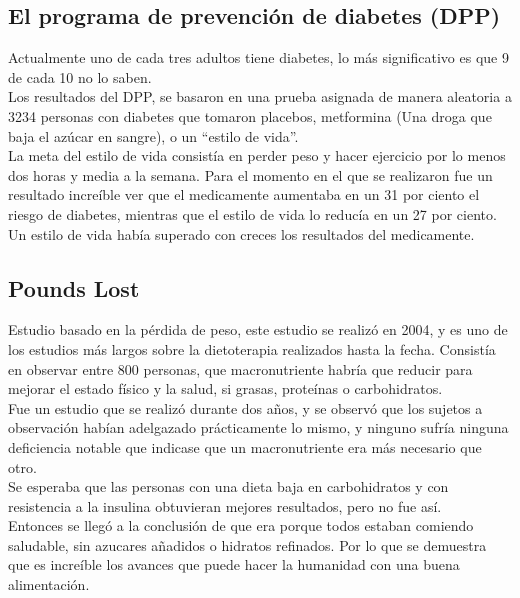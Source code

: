 \subsection{El programa de prevención de diabetes (DPP)\cite{DPP}}
Actualmente uno de cada tres adultos tiene diabetes, lo más significativo es que 9 de cada 10 no lo saben. \\

Los resultados del DPP, se basaron en una prueba asignada de manera aleatoria a 3234 personas con diabetes que tomaron placebos, metformina (Una droga que baja el azúcar en sangre), o un “estilo de vida”.\\

La meta del estilo de vida consistía en perder peso y hacer ejercicio por lo menos dos horas y media a la semana.
Para el momento en el que se realizaron fue un resultado increíble ver que el medicamente aumentaba en un 31 por ciento el riesgo de diabetes, mientras que el estilo de vida lo reducía en un 27 por ciento. Un estilo de vida había superado con creces los resultados del medicamente. \\

\subsection{Pounds Lost}
Estudio basado en la pérdida de peso, este estudio se realizó en 2004, y es uno de los estudios más largos sobre la dietoterapia realizados hasta la fecha. Consistía en observar entre 800 personas, que macronutriente habría que reducir para mejorar el estado físico y la salud, si grasas, proteínas o carbohidratos.\\

Fue un estudio que se realizó durante dos años, y se observó que los sujetos a observación habían adelgazado prácticamente lo mismo, y ninguno sufría ninguna deficiencia notable que indicase que un macronutriente era más necesario que otro.\\

Se esperaba que las personas con una dieta baja en carbohidratos y con resistencia a la insulina obtuvieran mejores resultados, pero no fue así.\\
Entonces se llegó a la conclusión de que era porque todos estaban comiendo saludable, sin azucares añadidos o hidratos refinados. Por lo que se demuestra que es increíble los avances que puede hacer la humanidad con una buena alimentación.
